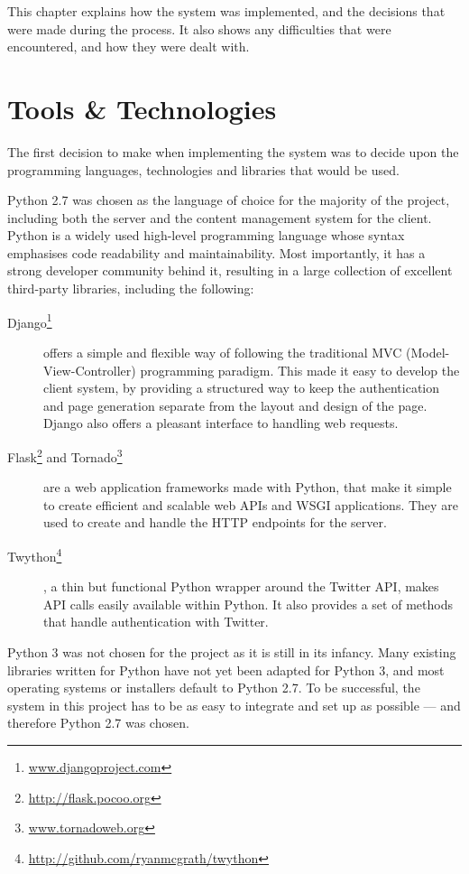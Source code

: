 \documentclass[11pt,a4paper]{report}
\begin{document}
This chapter explains how the system was implemented, and the decisions that were made during the process. It also shows any difficulties that were encountered, and how they were dealt with.

\section{Tools \& Technologies}
The first decision to make when implementing the system was to decide upon the programming languages, technologies and libraries that would be used.

Python 2.7 was chosen as the language of choice for the majority of the project, including both the server and the content management system for the client. Python is a widely used high-level programming language whose syntax emphasises code readability and maintainability. Most importantly, it has a strong developer community behind it, resulting in a large collection of excellent third-party libraries, including the following:

\begin{description}
    \item[Django\footnote{\url{www.djangoproject.com}}] offers a simple and flexible way of following the traditional MVC (Model-View-Controller) programming paradigm. This made it easy to develop the client system, by providing a structured way to keep the authentication and page generation separate from the layout and design of the page. Django also offers a pleasant interface to handling web requests.
    \item[Flask\footnote{\url{http://flask.pocoo.org}} and Tornado\footnote{\url{www.tornadoweb.org}}] are a web application frameworks made with Python, that make it simple to create efficient and scalable web APIs and WSGI applications. They are used to create and handle the HTTP endpoints for the server.
    \item[Twython\footnote{\url{http://github.com/ryanmcgrath/twython}}], a thin but functional Python wrapper around the Twitter API, makes API calls easily available within Python. It also provides a set of methods that handle authentication with Twitter.
\end{description}

Python 3 was not chosen for the project as it is still in its infancy. Many existing libraries written for Python have not yet been adapted for Python 3, and most operating systems or installers default to Python 2.7. To be successful, the system in this project has to be as easy to integrate and set up as possible --- and therefore Python 2.7 was chosen.
\end{document}
